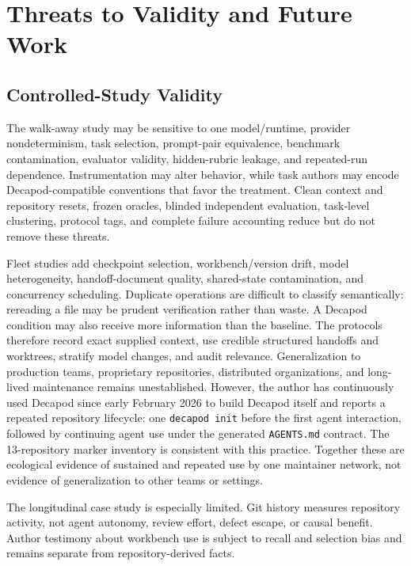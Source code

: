 \section{Threats to Validity and Future Work}
\label{sec:threats}

\subsection{Controlled-Study Validity}
The walk-away study may be sensitive to one model/runtime, provider nondeterminism, task selection, prompt-pair equivalence, benchmark contamination, evaluator validity, hidden-rubric leakage, and repeated-run dependence. Instrumentation may alter behavior, while task authors may encode Decapod-compatible conventions that favor the treatment. Clean context and repository resets, frozen oracles, blinded independent evaluation, task-level clustering, protocol tags, and complete failure accounting reduce but do not remove these threats.

Fleet studies add checkpoint selection, workbench/version drift, model heterogeneity, handoff-document quality, shared-state contamination, and concurrency scheduling. Duplicate operations are difficult to classify semantically: rereading a file may be prudent verification rather than waste. A Decapod condition may also receive more information than the baseline. The protocols therefore record exact supplied context, use credible structured handoffs and worktrees, stratify model changes, and audit relevance. Generalization to production teams, proprietary repositories, distributed organizations, and long-lived maintenance remains unestablished. However, the author has continuously used Decapod since early February 2026 to build Decapod itself and reports a repeated repository lifecycle: one \texttt{decapod init} before the first agent interaction, followed by continuing agent use under the generated \texttt{AGENTS.md} contract. The 13-repository marker inventory is consistent with this practice. Together these are ecological evidence of sustained and repeated use by one maintainer network, not evidence of generalization to other teams or settings.

The longitudinal case study is especially limited. Git history measures repository activity, not agent autonomy, review effort, defect escape, or causal benefit. Author testimony about workbench use is subject to recall and selection bias and remains separate from repository-derived facts.

